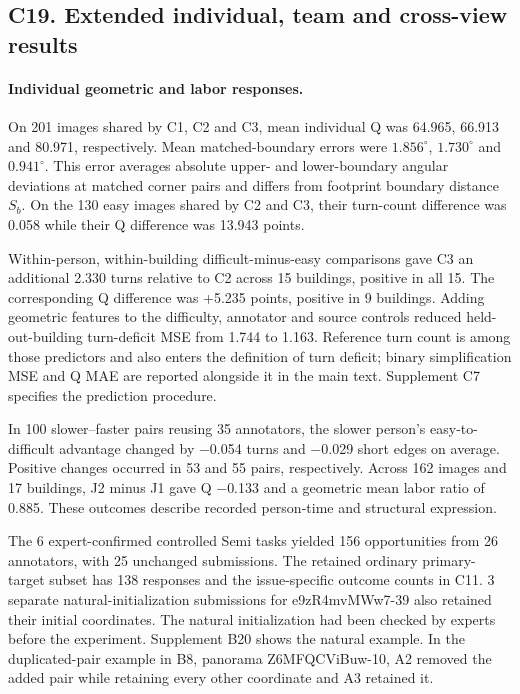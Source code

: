 \subsection*{C19. Extended individual, team and cross-view results}

\paragraph{Individual geometric and labor responses.}
On 201 images shared by C1, C2 and C3, mean individual Q was 64.965, 66.913 and 80.971, respectively. Mean matched-boundary errors were $1.856^\circ$, $1.730^\circ$ and $0.941^\circ$. This error averages absolute upper- and lower-boundary angular deviations at matched corner pairs and differs from footprint boundary distance $S_b$. On the 130 easy images shared by C2 and C3, their turn-count difference was 0.058 while their Q difference was 13.943 points.

Within-person, within-building difficult-minus-easy comparisons gave C3 an additional 2.330 turns relative to C2 across 15 buildings, positive in all 15. The corresponding Q difference was +5.235 points, positive in 9 buildings. Adding geometric features to the difficulty, annotator and source controls reduced held-out-building turn-deficit MSE from 1.744 to 1.163. Reference turn count is among those predictors and also enters the definition of turn deficit; binary simplification MSE and Q MAE are reported alongside it in the main text. Supplement C7 specifies the prediction procedure.

In 100 slower--faster pairs reusing 35 annotators, the slower person's easy-to-difficult advantage changed by $-$0.054 turns and $-$0.029 short edges on average. Positive changes occurred in 53 and 55 pairs, respectively. Across 162 images and 17 buildings, J2 minus J1 gave Q $-$0.133 and a geometric mean labor ratio of 0.885. These outcomes describe recorded person-time and structural expression.

The 6 expert-confirmed controlled Semi tasks yielded 156 opportunities from 26 annotators, with 25 unchanged submissions. The retained ordinary primary-target subset has 138 responses and the issue-specific outcome counts in C11. 3 separate natural-initialization submissions for e9zR4mvMWw7-39 also retained their initial coordinates. The natural initialization had been checked by experts before the experiment. Supplement B20 shows the natural example. In the duplicated-pair example in B8, panorama Z6MFQCViBuw-10, A2 removed the added pair while retaining every other coordinate and A3 retained it.

